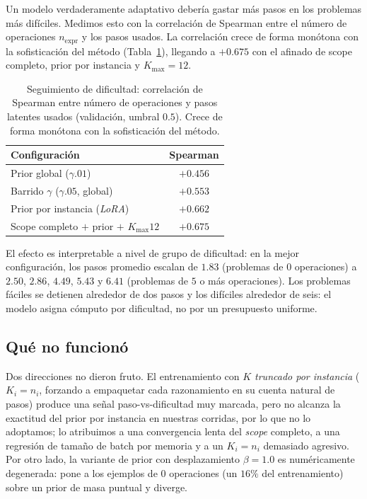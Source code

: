\documentclass[11pt]{article}
\begin{document}
Un modelo verdaderamente adaptativo debería gastar más pasos en los problemas más difíciles. Medimos esto con la correlación de Spearman entre el número de operaciones $n_{\text{expr}}$ y los pasos usados. La correlación crece de forma monótona con la sofisticación del método (Tabla~\ref{tab:spearman}), llegando a $+0.675$ con el afinado de scope completo, prior por instancia y $K_{\max}=12$.

\begin{table}[t]
  \centering
  \small
  \begin{tabular}{lc}
    \toprule
    \textbf{Configuración} & \textbf{Spearman} \\
    \midrule
    Prior global ($\gamma.01$) & $+0.456$ \\
    Barrido $\gamma$ ($\gamma.05$, global) & $+0.553$ \\
    Prior por instancia (\textit{LoRA}) & $+0.662$ \\
    Scope completo $+$ prior $+$ $K_{\max}12$ & $\mathbf{+0.675}$ \\
    \bottomrule
  \end{tabular}
  \caption{Seguimiento de dificultad: correlación de Spearman entre número de operaciones y pasos latentes usados (validación, umbral $0.5$). Crece de forma monótona con la sofisticación del método.}
  \label{tab:spearman}
\end{table}

El efecto es interpretable a nivel de grupo de dificultad: en la mejor configuración, los pasos promedio escalan de $1.83$ (problemas de $0$ operaciones) a $2.50$, $2.86$, $4.49$, $5.43$ y $6.41$ (problemas de $5$ o más operaciones). Los problemas fáciles se detienen alrededor de dos pasos y los difíciles alrededor de seis: el modelo asigna cómputo por dificultad, no por un presupuesto uniforme.

\subsection{Qué no funcionó}

Dos direcciones no dieron fruto. El entrenamiento con \emph{$K$ truncado por instancia} ($K_i = n_i$, forzando a empaquetar cada razonamiento en su cuenta natural de pasos) produce una señal paso-vs-dificultad muy marcada, pero no alcanza la exactitud del prior por instancia en nuestras corridas, por lo que no lo adoptamos; lo atribuimos a una convergencia lenta del \textit{scope} completo, a una regresión de tamaño de batch por memoria y a un $K_i = n_i$ demasiado agresivo. Por otro lado, la variante de prior con desplazamiento $\beta=1.0$ es numéricamente degenerada: pone a los ejemplos de $0$ operaciones (un $16\%$ del entrenamiento) sobre un prior de masa puntual y diverge.
\end{document}

